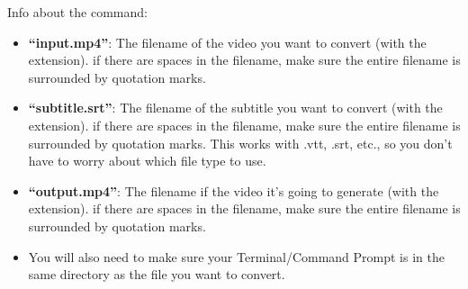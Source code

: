 \documentclass{article}
\begin{document}
Info about the command:
\begin{itemize}
    \item \textbf{``input.mp4''}: The filename of the video you want to convert (with the extension). if there are spaces in the filename, make sure the entire filename is surrounded by quotation marks. 
    \item \textbf{``subtitle.srt''}: The filename of the subtitle you want to convert (with the extension). if there are spaces in the filename, make sure the entire filename is surrounded by quotation marks. This works with .vtt, .srt, etc., so you don't have to worry about which file type to use.
    \item \textbf{``output.mp4''}: The filename if the video it's going to generate (with the extension). if there are spaces in the filename, make sure the entire filename is surrounded by quotation marks. 
    \item You will also need to make sure your Terminal/Command Prompt is in the same directory as the file you want to convert.
\end{itemize}
\end{document}
